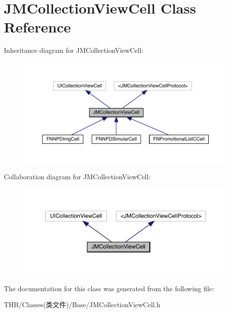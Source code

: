 \hypertarget{interface_j_m_collection_view_cell}{}\section{J\+M\+Collection\+View\+Cell Class Reference}
\label{interface_j_m_collection_view_cell}


Inheritance diagram for J\+M\+Collection\+View\+Cell\+:\nopagebreak
\begin{figure}[H]
\begin{center}
\leavevmode
\includegraphics[width=350pt]{interface_j_m_collection_view_cell__inherit__graph}
\end{center}
\end{figure}


Collaboration diagram for J\+M\+Collection\+View\+Cell\+:\nopagebreak
\begin{figure}[H]
\begin{center}
\leavevmode
\includegraphics[width=350pt]{interface_j_m_collection_view_cell__coll__graph}
\end{center}
\end{figure}


The documentation for this class was generated from the following file\+:\begin{DoxyCompactItemize}
\item 
T\+H\+B/\+Classes(类文件)/\+Base/J\+M\+Collection\+View\+Cell.\+h\end{DoxyCompactItemize}
